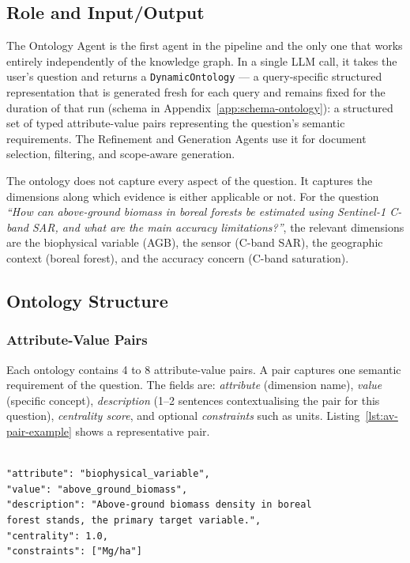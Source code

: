 \subsection{Role and Input/Output}
\label{subsec:ontology-role}

The Ontology Agent is the first agent in the pipeline and the only one that works entirely independently of the knowledge graph. In a single LLM call, it takes the user's question and returns a \texttt{DynamicOntology} --- a query-specific structured representation that is generated fresh for each query and remains fixed for the duration of that run (schema in Appendix~\ref{app:schema-ontology}): a structured set of typed attribute-value pairs representing the question's semantic requirements. The Refinement and Generation Agents use it for document selection, filtering, and scope-aware generation.

The ontology does not capture every aspect of the question. It captures the dimensions along which evidence is either applicable or not. For the question \textit{``How can above-ground biomass in boreal forests be estimated using Sentinel-1 C-band SAR, and what are the main accuracy limitations?''}, the relevant dimensions are the biophysical variable (AGB), the sensor (C-band SAR), the geographic context (boreal forest), and the accuracy concern (C-band saturation).

\subsection{Ontology Structure}
\label{subsec:ontology-structure}

\subsubsection{Attribute-Value Pairs}
\label{subsubsec:av-pairs}

Each ontology contains 4 to 8 attribute-value pairs. A pair captures one semantic requirement of the question. The fields are: \emph{attribute} (dimension name), \emph{value} (specific concept), \emph{description} (1--2 sentences contextualising the pair for this question), \emph{centrality score}, and optional \emph{constraints} such as units. Listing~\ref{lst:av-pair-example} shows a representative pair.

\begin{lstlisting}[language={}, caption={Example attribute-value pair for the boreal biomass question.}, label={lst:av-pair-example}]

"attribute": "biophysical_variable",
"value": "above_ground_biomass",
"description": "Above-ground biomass density in boreal
forest stands, the primary target variable.",
"centrality": 1.0,
"constraints": ["Mg/ha"]

\end{lstlisting}

